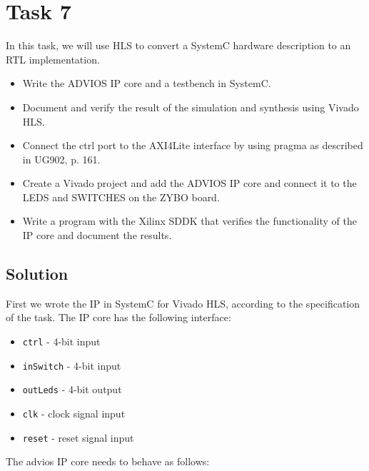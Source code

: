 \documentclass[../main.tex]{subfiles}
\begin{document}
\section{Task 7}

In this task, we will use HLS to convert a SystemC hardware description to an RTL implementation.

\begin{itemize}
    \item Write the ADVIOS IP core and a testbench in SystemC.
    \item Document and verify the result of the simulation and synthesis using Vivado HLS.
    \item Connect the ctrl port to the AXI4Lite interface by using pragma as described in UG902, p. 161.
    \item Create a Vivado project and add the ADVIOS IP core and connect it to the LEDS and SWITCHES on the ZYBO board.
    \item Write a program with the Xilinx SDDK that verifies the functionality of the IP core and document the results.
\end{itemize}

\subsection*{Solution}

First we wrote the IP in SystemC for Vivado HLS, according to the specification of the task. 
The IP core has the following interface:
\begin{itemize}
    \item \texttt{ctrl} - 4-bit input
    \item \texttt{inSwitch} - 4-bit input
    \item \texttt{outLeds} - 4-bit output
    \item \texttt{clk} - clock signal input
    \item \texttt{reset} - reset signal input
\end{itemize}

\noindent The advios IP core needs to behave as follows:
\end{document}
